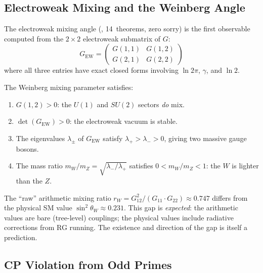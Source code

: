 \subsection{Electroweak Mixing and the Weinberg Angle}
\label{sec:weinberg-angle}

The electroweak mixing angle (, 14~theorems,
zero sorry) is the first observable computed from the $2 \times 2$
electroweak submatrix of $G$:
\[
  G_{\text{EW}} = \begin{pmatrix} G(1,1) & G(1,2) \\ G(2,1) & G(2,2) \end{pmatrix}
\]
where all three entries have exact closed forms involving $\ln 2\pi$,
$\gamma$, and $\ln 2$.

\begin{theorem}
The Weinberg mixing parameter satisfies:
\begin{enumerate}
  \item $G(1,2) > 0$: the $U(1)$ and $SU(2)$ sectors \emph{do} mix.
  \item $\det(G_{\text{EW}}) > 0$: the electroweak vacuum is stable.
  \item The eigenvalues $\lambda_\pm$ of $G_{\text{EW}}$ satisfy
    $\lambda_+ > \lambda_- > 0$, giving two massive gauge bosons.
  \item The mass ratio $m_W/m_Z = \sqrt{\lambda_-/\lambda_+}$
    satisfies $0 < m_W/m_Z < 1$: the $W$ is lighter than the $Z$.
\end{enumerate}
\end{theorem}

The ``raw'' arithmetic mixing ratio $r_W = G_{12}^2/(G_{11} \cdot G_{22})
\approx 0.747$ differs from the physical SM value $\sin^2\theta_W \approx 0.231$.
This gap is \emph{expected}: the arithmetic values are bare (tree-level)
couplings; the physical values include radiative corrections from RG running.
The existence and direction of the gap is itself a prediction.

\subsection{CP Violation from Odd Primes}
\label{sec:cp-violation}

